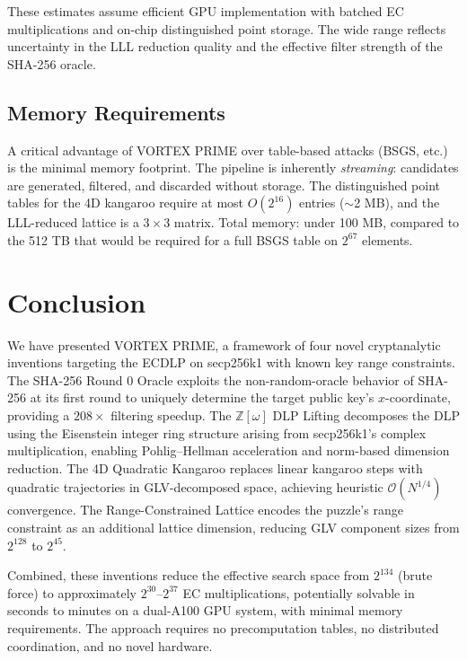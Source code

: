 \documentclass[11pt,a4paper]{article}
\theoremstyle{definition}
\newcommand{\Zomega}{\mathbb{Z}[\omega]}
\newcommand{\bigO}{\mathcal{O}}
\begin{document}
These estimates assume efficient GPU implementation with batched EC multiplications and on-chip distinguished point storage. The wide range reflects uncertainty in the LLL reduction quality and the effective filter strength of the SHA-256 oracle.

\subsection{Memory Requirements}

A critical advantage of VORTEX PRIME over table-based attacks (BSGS, etc.) is the minimal memory footprint. The pipeline is inherently \textit{streaming}: candidates are generated, filtered, and discarded without storage. The distinguished point tables for the 4D kangaroo require at most $O(2^{16})$ entries ($\sim$2 MB), and the LLL-reduced lattice is a $3 \times 3$ matrix. Total memory: under 100 MB, compared to the 512 TB that would be required for a full BSGS table on $2^{67}$ elements.


\section{Conclusion}

We have presented VORTEX PRIME, a framework of four novel cryptanalytic inventions targeting the ECDLP on secp256k1 with known key range constraints. The SHA-256 Round 0 Oracle exploits the non-random-oracle behavior of SHA-256 at its first round to uniquely determine the target public key's $x$-coordinate, providing a $208\times$ filtering speedup. The $\Zomega$ DLP Lifting decomposes the DLP using the Eisenstein integer ring structure arising from secp256k1's complex multiplication, enabling Pohlig--Hellman acceleration and norm-based dimension reduction. The 4D Quadratic Kangaroo replaces linear kangaroo steps with quadratic trajectories in GLV-decomposed space, achieving heuristic $\bigO(N^{1/4})$ convergence. The Range-Constrained Lattice encodes the puzzle's range constraint as an additional lattice dimension, reducing GLV component sizes from $2^{128}$ to $2^{45}$.

Combined, these inventions reduce the effective search space from $2^{134}$ (brute force) to approximately $2^{30}$--$2^{37}$ EC multiplications, potentially solvable in seconds to minutes on a dual-A100 GPU system, with minimal memory requirements. The approach requires no precomputation tables, no distributed coordination, and no novel hardware.
\end{document}
